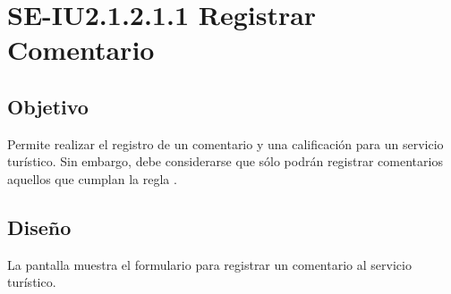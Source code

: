 \newpage
\section{SE-IU2.1.2.1.1 Registrar Comentario}

\subsection{Objetivo}
Permite realizar el registro de un comentario y una calificación para un servicio turístico. Sin embargo, debe considerarse que sólo podrán registrar comentarios aquellos que cumplan la regla .

\subsection{Diseño}
La pantalla  muestra el formulario para registrar un comentario al servicio turístico.


